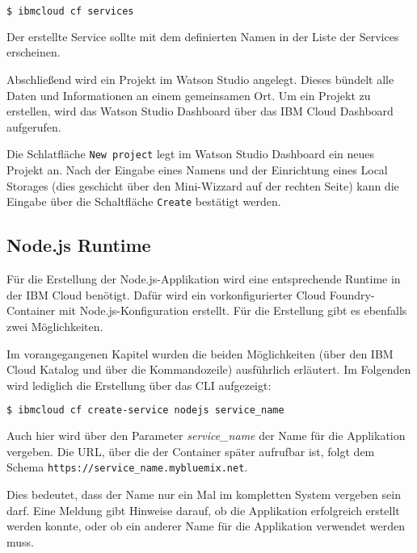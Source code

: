 \begin{lstlisting}[language=bash, caption=Auflisten aller Services in einer Organisation, label=Auflisten aller Services in einer Organisation]
    $ ibmcloud cf services
\end{lstlisting}

Der erstellte Service sollte mit dem definierten Namen in der Liste der Services erscheinen.

Abschließend wird ein Projekt im Watson Studio angelegt. Dieses bündelt alle Daten und Informationen an einem gemeinsamen
Ort. Um ein Projekt zu erstellen, wird das Watson Studio Dashboard über das IBM Cloud Dashboard aufgerufen.

Die Schlatfläche \texttt{New project} legt im Watson Studio Dashboard ein neues Projekt an. Nach der Eingabe
eines Namens und der Einrichtung eines Local Storages (dies geschicht über den Mini-Wizzard auf der rechten Seite) kann
die Eingabe über die Schaltfläche \texttt{Create} bestätigt werden.

\subsection{Node.js Runtime}
\label{ssc:nodejs_runtime}
Für die Erstellung der Node.js-Applikation wird eine entsprechende Runtime in der IBM Cloud benötigt. Dafür wird ein
vorkonfigurierter Cloud Foundry-Container mit Node.js-Konfiguration erstellt. Für die Erstellung gibt es ebenfalls zwei
Möglichkeiten.

Im vorangegangenen Kapitel wurden die beiden Möglichkeiten (über den IBM Cloud Katalog und über die Kommandozeile)
ausführlich erläutert. Im Folgenden wird lediglich die Erstellung über das CLI aufgezeigt:

\begin{lstlisting}[language=bash, caption=Instanziierung der Node.js Runtime, label=Instanziierung der Node.JS Runtime]
    $ ibmcloud cf create-service nodejs service_name
\end{lstlisting}

Auch hier wird über den Parameter \textit{service\_name} der Name für die Applikation vergeben. Die URL, über die
der Container später aufrufbar ist, folgt dem Schema \texttt{https://service\_name.mybluemix.net}.

Dies bedeutet, dass der Name nur ein Mal im kompletten System vergeben sein darf. Eine Meldung gibt Hinweise darauf, ob
die Applikation erfolgreich erstellt werden konnte, oder ob ein anderer Name für die Applikation verwendet werden muss.

